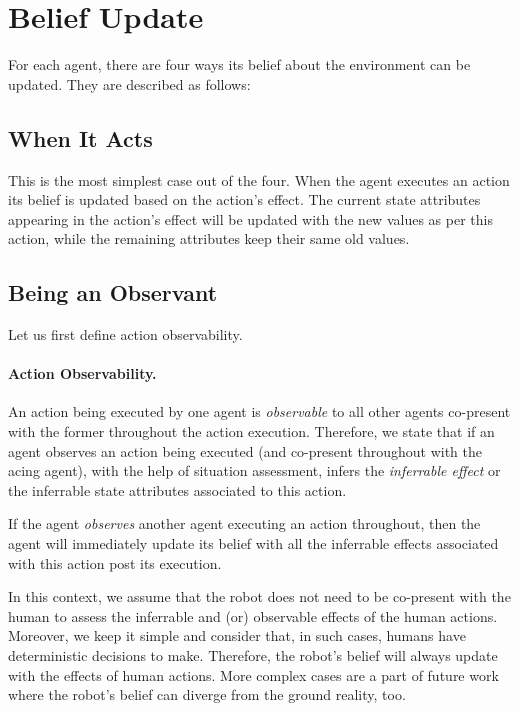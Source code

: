 \documentclass[letterpaper]{article} %
\begin{document}
\section{Belief Update}
For each agent, there are four ways its belief about the environment can be updated. They are described as follows:

\subsection{When It Acts}
This is the most simplest case out of the four. When the agent executes an action its belief is updated based on the action's effect. The current state attributes appearing in the action's effect will be updated with the new values as per this action, while the remaining attributes keep their same old values.  

\subsection{Being an Observant}
Let us first define action observability.

\paragraph{Action Observability.}
An action being executed by one agent is \textit{observable} to all other agents co-present with the former throughout the action execution. 
Therefore, we state that if an agent observes an action being executed (and co-present throughout with the acing agent), with the help of situation assessment, infers the \textit{inferrable effect} or the inferrable state attributes associated to this action.

If the agent 
{\em observes} another agent executing an action throughout,
then the agent will immediately update its belief with all the inferrable effects associated with this action  post its execution. 

In this context, we assume that the robot does not need to be co-present with the human to assess the inferrable and (or) observable effects of the human actions. Moreover, we keep it simple and consider that, in such cases, humans have deterministic decisions to make. Therefore, the robot's belief will always update with the effects of human actions. More complex cases are a part of future work where the robot's belief can diverge from the ground reality, too. 
\end{document}
